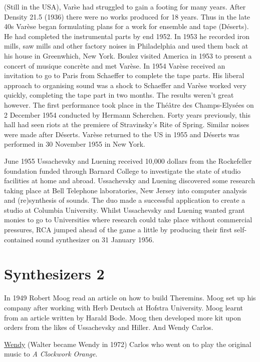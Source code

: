 (Still in the USA), Var\`se had struggled to gain a footing for many years. After Density 21.5 (1936) there were no works produced for 18 years. Thus in the late 40s Var\`ese began formulating plans for a work for ensemble and tape (D\'eserts). He had completed the instrumental parts by end 1952. In 1953 he recorded iron mills, saw mills and other factory noises in Philadelphia and used them back at his house in Greenwhich, New York. Boulez visited America in 1953 to present a concert of musique concr\`ete and met Var\`ese. In 1954 Var\`ese received an invitation to go to Paris from Schaeffer to complete the tape parts. His liberal approach to organising sound was a shock to Schaeffer and Var\`ese worked very quickly, completing the tape part in two months. The results weren't great however. The first performance took place in the Th\'e\^atre des Champs-Elysées on 2 December 1954 conducted by Hermann Scherchen. Forty years previously, this hall had seen riots at the premiere of Stravinsky's Rite of Spring. Similar noises were made after D\'eserts. Var\`ese returned to the US in 1955 and D\'eserts was performed in 30 November 1955 in New York.

June 1955 Ussachevsky and Luening received 10,000 dollars from the Rockefeller foundation funded through Barnard College to investigate the state of studio facilities at home and abroad. Ussachevsky and Luening discovered some research taking place at Bell Telephone laboratories, New Jersey into computer analysis and (re)synthesis of sounds. The duo made a successful application to create a studio at Columbia University. Whilst Ussachevsky and Luening wanted grant monies to go to Universities where research could take place without commercial pressures, RCA jumped ahead of the game a little by producing their first self-contained sound synthesizer on 31 January 1956.

\section{Synthesizers 2}

In 1949 Robert Moog read an article on how to build Theremins. Moog set up his company after working with Herb Deutsch at Hofstra University. Moog learnt from an article written by Harald Bode. Moog then developed more kit upon orders from the likes of Ussachevsky and Hiller. And Wendy Carlos.

\href{http://www.wendycarlos.com/}{Wendy} (Walter became Wendy in 1972) Carlos who went on to play the original music to \textit{A Clockwork Orange}.

